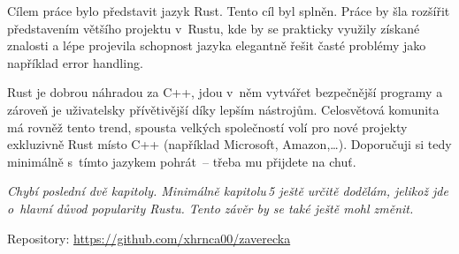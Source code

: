 \documentclass[main.tex]{subfiles}
\begin{document}

Cílem práce bylo představit jazyk Rust. Tento cíl byl splněn. Práce by šla rozšířit
představením většího projektu v~Rustu, kde by se prakticky využily získané znalosti a lépe
projevila schopnost jazyka elegantně řešit časté problémy jako například error handling.

Rust je dobrou náhradou za C++, jdou v~něm vytvářet bezpečnější programy a zároveň je
uživatelsky přívětivější díky lepším nástrojům. Celosvětová komunita má rovněž tento
trend, spousta velkých společností volí pro nové projekty exkluzivně Rust místo C++
(například Microsoft, Amazon,\dots). Doporučuji si tedy minimálně s~tímto jazykem
pohrát~-- třeba mu přijdete na chuť.

\emph{
    Chybí poslední dvě kapitoly. Minimálně kapitolu\,5 ještě určitě dodělám, jelikož jde
    o~hlavní důvod popularity Rustu. Tento závěr by se také ještě mohl změnit.
}

Repository: \url{https://github.com/xhrnca00/zaverecka}
\end{document}
